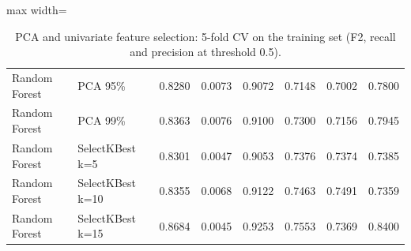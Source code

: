 \begin{table}[H]
\begin{adjustbox}{max width=\linewidth}
\begin{tabular}{llrrrrrr}
Random Forest & PCA 95\% & 0.8280 & 0.0073 & 0.9072 & 0.7148 & 0.7002 & 0.7800 \\
Random Forest & PCA 99\% & 0.8363 & 0.0076 & 0.9100 & 0.7300 & 0.7156 & 0.7945 \\
Random Forest & SelectKBest k=5 & 0.8301 & 0.0047 & 0.9053 & 0.7376 & 0.7374 & 0.7385 \\
Random Forest & SelectKBest k=10 & 0.8355 & 0.0068 & 0.9122 & 0.7463 & 0.7491 & 0.7359 \\
Random Forest & SelectKBest k=15 & 0.8684 & 0.0045 & 0.9253 & 0.7553 & 0.7369 & 0.8400 \\
\bottomrule
\end{tabular}
\end{adjustbox}
\caption{PCA and univariate feature selection: 5-fold CV on the training set (F2, recall and precision at threshold 0.5).}
\label{tab:suite_dimensionality}
\end{table}
